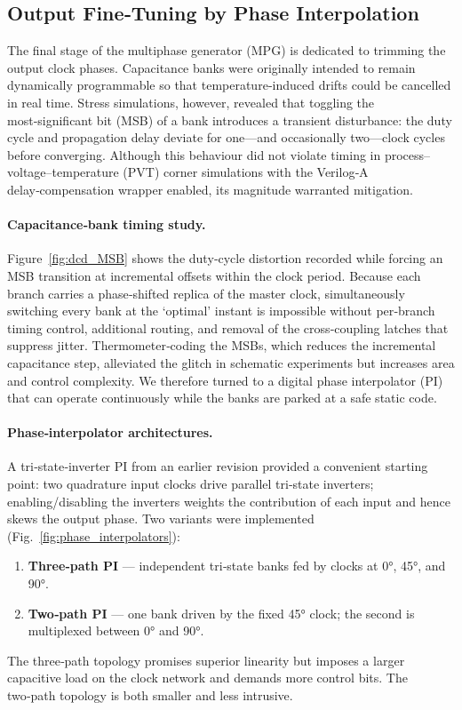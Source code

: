 \subsection{Output Fine‑Tuning by Phase Interpolation}\label{sec:output_finetuning}

The final stage of the multiphase generator (MPG) is dedicated to trimming the output clock phases. Capacitance banks were originally intended to remain dynamically programmable so that temperature‑induced drifts could be cancelled in real time. Stress simulations, however, revealed that toggling the most‑significant bit (MSB) of a bank introduces a transient disturbance: the duty cycle and propagation delay deviate for one—and occasionally two—clock cycles before converging. Although this behaviour did not violate timing in process–voltage–temperature (PVT) corner simulations with the Verilog‑A delay‑compensation wrapper enabled, its magnitude warranted mitigation.

\paragraph{Capacitance‑bank timing study.} Figure~\ref{fig:dcd_MSB} shows the duty‑cycle distortion recorded while forcing an MSB transition at incremental offsets within the clock period. Because each branch carries a phase‑shifted replica of the master clock, simultaneously switching every bank at the ‘optimal’ instant is impossible without per‑branch timing control, additional routing, and removal of the cross‑coupling latches that suppress jitter. Thermometer‑coding the MSBs, which reduces the incremental capacitance step, alleviated the glitch in schematic experiments but increases area and control complexity. We therefore turned to a digital phase interpolator (PI) that can operate continuously while the banks are parked at a safe static code.

\paragraph{Phase‑interpolator architectures.} A tri‑state‑inverter PI from an earlier revision provided a convenient starting point: two quadrature input clocks drive parallel tri‑state inverters; enabling/disabling the inverters weights the contribution of each input and hence skews the output phase. Two variants were implemented (Fig.~\ref{fig:phase_interpolators}):
\begin{enumerate}
\item \textbf{Three‑path PI} — independent tri‑state banks fed by clocks at \ang{0}, \ang{45}, and \ang{90}.
\item \textbf{Two‑path PI} — one bank driven by the fixed \ang{45} clock; the second is multiplexed between \ang{0} and \ang{90}.
\end{enumerate}
The three‑path topology promises superior linearity but imposes a larger capacitive load on the clock network and demands more control bits. The two‑path topology is both smaller and less intrusive.

